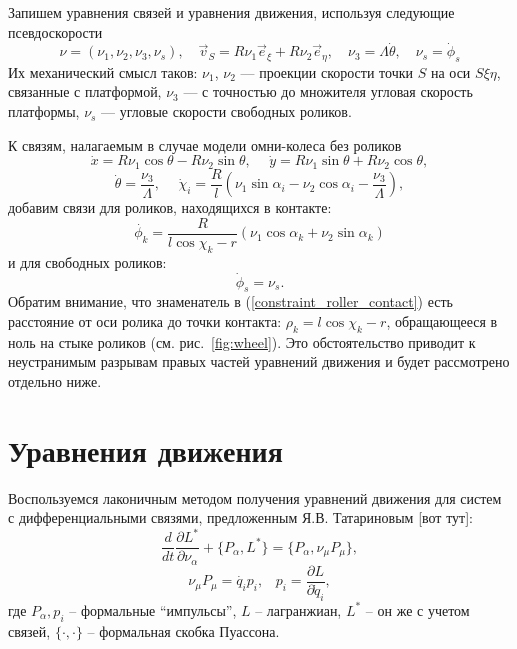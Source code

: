 Запишем уравнения связей и уравнения движения, используя следующие псевдоскорости
$$\nu = (\nu_1, \nu_2, \nu_3, \nu_s), \quad \vec{v}_S = R\nu_1\vec{e}_\xi + R\nu_2\vec{e}_\eta, \quad \nu_3 = \Lambda\dot{\theta},\quad \nu_s = \dot{\phi}_s$$
Их механический смысл таков: $\nu_1$, $\nu_2$ --- проекции скорости точки $S$ на оси $S\xi\eta$, связанные с платформой, $\nu_3$ --- с точностью до множителя угловая скорость платформы, $\nu_s$ --- угловые скорости свободных роликов.

К связям, налагаемым в случае модели омни-колеса без роликов \cite{Zobova2011}
$$ \dot{x} = R \nu_1\cos\theta-R\nu_2\sin\theta, \hspace{15pt} \dot{y} = R\nu_1\sin\theta+R\nu_2\cos\theta,$$
$$\dot{\theta} = \frac{\nu_3}{\Lambda}, \hspace{15pt} \dot{\chi}_i = \frac{R}{l}(\nu_1\sin\alpha_i - \nu_2\cos\alpha_i - \frac{\nu_3}{\Lambda}),$$
добавим связи для роликов, находящихся в контакте:
\begin{equation}\label{constraint_roller_contact}
\dot{\phi_k} = \frac{R}{l\cos\chi_k-r}(\nu_1\cos\alpha_k + \nu_2\sin\alpha_k)    
\end{equation}
и для свободных роликов:
$$\dot{\phi}_s = \nu_s.$$
Обратим внимание, что  знаменатель в (\ref{constraint_roller_contact}) есть расстояние от оси ролика до точки контакта: $\rho_k = l\cos\chi_k - r$, обращающееся в ноль на стыке роликов (см. рис.~\ref{fig:wheel}). Это обстоятельство приводит к неустранимым разрывам правых частей уравнений движения и будет рассмотрено отдельно ниже.


\section{Уравнения движения}

Воспользуемся лаконичным методом получения уравнений движения для систем с дифференциальными связями, предложенным Я.В. Татариновым [вот тут]:
$$ \frac{d}{dt}\frac{\partial L^{*}}{\partial \nu_\alpha}  + \{P_\alpha, L^{*}\} = \{P_\alpha, \nu_\mu P_\mu\}, $$
$$ \nu_\mu P_\mu = \dot{q_i} p_i, \hspace{10pt} p_i = \frac{\partial L}{\partial \dot{q}_i},$$
где $P_\alpha, p_i$ -- формальные ``импульсы'', $L$ -- лагранжиан, $L^*$ -- он же с учетом связей, $\{\cdot, \cdot\}$ -- формальная скобка Пуассона.

